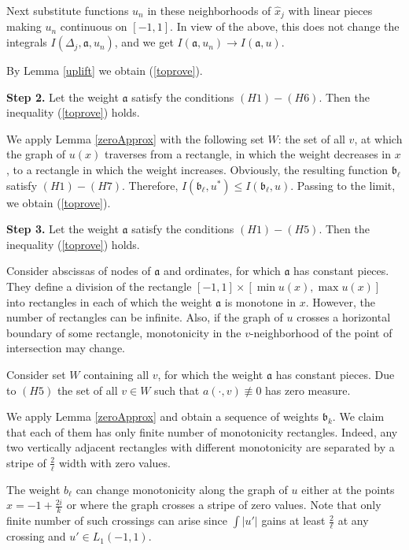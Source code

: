 Next substitute functions $u_n$ in these neighborhoods of $\hat{x}_j$ with linear pieces
making $u_n$ continuous on $[-1, 1]$.
In view of the above, this does not change the integrals $I(\Delta_j, \mathfrak a, u_n)$,
and we get $I(\mathfrak a, u_n) \to I(\mathfrak a, u)$.

By Lemma \ref{uplift} we obtain (\ref{toprove}).

\bigskip

{\bf Step 2.} Let the weight $\mathfrak a$ satisfy the conditions $(H1)-(H6)$.
Then the inequality (\ref{toprove}) holds.

We apply Lemma \ref{zeroApprox} with the following set $W$:
the set of all $v$, at which the graph of $u(x)$ traverses from a rectangle,
in which the weight decreases in $x$,
to a rectangle in which the weight increases.
Obviously, the resulting function $\mathfrak b_{\ell}$ satisfy $(H1)-(H7)$.
Therefore, $I(\mathfrak b_{\ell}, u^*) \le I(\mathfrak b_{\ell}, u)$.
Passing to the limit, we obtain (\ref{toprove}).

\bigskip

{\bf Step 3.} Let the weight $\mathfrak a$ satisfy the conditions $(H1)-(H5)$.
Then the inequality (\ref{toprove}) holds.

Consider abscissas of nodes of $\mathfrak a$
and ordinates, for which $\mathfrak a$ has constant pieces.
They define a division of the rectangle $[-1, 1] \times [\min u(x), \max u(x)]$
into rectangles in each of which the weight $\mathfrak a$ is monotone in $x$.
However, the number of rectangles can be infinite.
Also, if the graph of $u$ crosses a horizontal boundary of some rectangle,
monotonicity in the $v$-neighborhood of the point of intersection may change.

Consider set $W$ containing all $v$, for which the weight $\mathfrak a$ has constant pieces.
Due to $(H5)$ the set of all  $v \in W$ such that $a(\cdot, v) \not\equiv 0$ has zero measure.

We apply Lemma \ref{zeroApprox} and obtain a sequence of weights $\mathfrak b_k$.
We claim that each of them has only finite number of monotonicity rectangles.
Indeed, any two vertically adjacent rectangles with different monotonicity
are separated by a stripe of $\frac{2}{\ell}$ width with zero values.

The weight $b_{\ell}$ can change monotonicity along the graph of $u$
either at the points $x = -1 + \frac{2 i}{k}$ or where the graph crosses a stripe of zero values.
Note that only finite number of such crossings can arise since
$\int |u'|$ gains at least $\frac{2}{\ell}$ at any crossing and $u' \in L_1(-1, 1)$.

